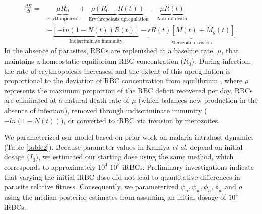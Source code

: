 \documentclass[10pt,letterpaper]{article}
\begin{document}
\begin{equation}
\label{eq:scheme15}
\begin{split}
    \frac{dR}{dt}=& \underbrace{\mu R_{0}}_{\text{Erythropoiesis}}+\underbrace{\rho(R_{0}-R(t))}_{\text{ Erythropoiesis upregulation}}-\underbrace{\mu R(t)}_{\text{Natural death}}\\ & -\underbrace{[-ln(1-N(t))R(t)]}_{\text{Indiscriminate immunity}}-\underbrace{\epsilon R(t)[M(t)+M_{g}(t)]}_{\text{Merozoite invasion}}.
    \end{split}
\end{equation}
In the absence of parasites, RBCs are replenished at a baseline rate, $\mu$, that maintains a homeostatic equilibrium RBC concentration ($R_{0}$). During infection, the rate of erythropoiesis increases, and the extent of this upregulation is proportional to the deviation of RBC concentration from equilibrium \cite{chang_modulation_2004}, where $\rho$ represents the maximum proportion of the RBC deficit recovered per day. RBCs are eliminated at a natural death rate of $\mu$ (which balances new production in the absence of infection), removed through indiscriminate immunity ($-ln(1-N(t))$), or converted to iRBC via invasion by merozoites.\newline 

We parameterized our model based on prior work on malaria intrahost dynamics \cite{greischar_predicting_2016, kamiya_uncovering_2020} (Table \ref{table2}). Because parameter values in Kamiya \emph{et al.} \cite{kamiya_uncovering_2020} depend on initial dosage ($I_{0}$), we estimated our starting dose using the same method, which corresponds to approximately $10^4$-$10^5$ iRBCs. Preliminary investigations indicate that varying the initial iRBC dose did not lead to quantitative differences in parasite relative fitness. Consequently, we parameterized $\psi_{n},\psi_{w},\phi_{n},\phi_{w}$ and $\rho$ using the median posterior estimates from \cite{kamiya_uncovering_2020} assuming an initial dosage of $10^4$ iRBCs.
\end{document}
